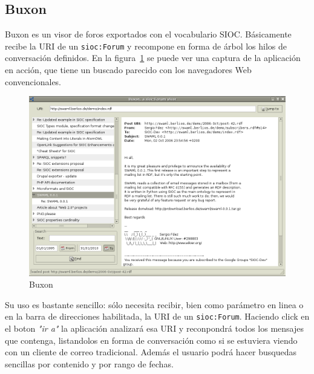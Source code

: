 \subsection*{Buxon}

Buxon es un visor de foros exportados con el vocabulario SIOC. Básicamente 
recibe la URI de un \texttt{sioc:Forum} y recompone en forma de árbol los
hilos de conversación definidos. En la figura~\ref{fig:buxon} se puede ver
una captura de la aplicación en acción, que tiene un buscado parecido con 
los navegadores Web convencionales.

\begin{figure}[H]
	\centering
	\includegraphics[width=16cm]{images/screenshots/buxon.png}
	\caption{Buxon}
	\label{fig:buxon}
\end{figure}

Su uso es bastante sencillo: sólo necesita recibir, bien como parámetro en linea
o en la barra de direcciones habilitada, la URI de un \texttt{sioc:Forum}.
Haciendo click en el boton \textit{"ir a"} la aplicación analizará esa URI y reconpondrá
todos los mensajes que contenga, listandolos en forma de conversación como si se estuviera
viendo con un cliente de correo tradicional. Además el usuario podrá hacer busquedas
sencillas por contenido y por rango de fechas.
